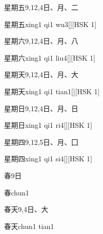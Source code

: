 \begin{entry}{星期五}{9,12,4}{⽇、⽉、⼆}
  \begin{phonetics}{星期五}{xing1 qi1 wu3}[][HSK 1]
  \end{phonetics}
\end{entry}

\begin{entry}{星期六}{9,12,4}{⽇、⽉、⼋}
  \begin{phonetics}{星期六}{xing1 qi1 liu4}[][HSK 1]
  \end{phonetics}
\end{entry}

\begin{entry}{星期天}{9,12,4}{⽇、⽉、⼤}
  \begin{phonetics}{星期天}{xing1 qi1 tian1}[][HSK 1]
  \end{phonetics}
\end{entry}

\begin{entry}{星期日}{9,12,4}{⽇、⽉、⽇}
  \begin{phonetics}{星期日}{xing1 qi1 ri4}[][HSK 1]
  \end{phonetics}
\end{entry}

\begin{entry}{星期四}{9,12,5}{⽇、⽉、⼞}
  \begin{phonetics}{星期四}{xing1 qi1 si4}[][HSK 1]
  \end{phonetics}
\end{entry}

\begin{entry}{春}{9}{⽇}
  \begin{phonetics}{春}{chun1}
  \end{phonetics}
\end{entry}

\begin{entry}{春天}{9,4}{⽇、⼤}
  \begin{phonetics}{春天}{chun1 tian1}
  \end{phonetics}
\end{entry}

